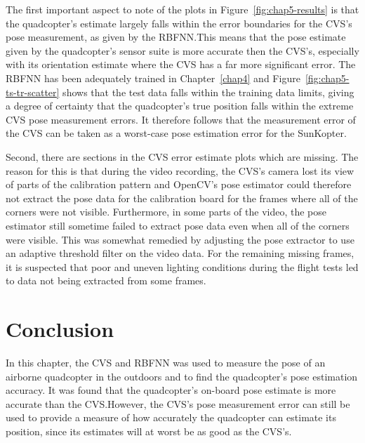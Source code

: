 The first important aspect to note of the plots in Figure~\ref{fig:chap5-results} is that the quadcopter's estimate largely falls within the error boundaries for the CVS's pose measurement, as given by the RBFNN.\@ This means that the pose estimate given by the quadcopter's sensor suite is more accurate then the CVS's, especially with its orientation estimate where the CVS has a far more significant error. The RBFNN has been adequately trained in Chapter~\ref{chap4} and Figure~\ref{fig:chap5-ts-tr-scatter} shows that the test data falls within the training data limits, giving a degree of certainty that the quadcopter's true position falls within the extreme CVS pose measurement errors. It therefore follows that the measurement error of the CVS can be taken as a worst-case pose estimation error for the SunKopter. 

Second, there are sections in the CVS error estimate plots which are missing. The reason for this is that during the video recording, the CVS's camera lost its view of parts of the calibration pattern and OpenCV's pose estimator could therefore not extract the pose data for the calibration board for the frames where all of the corners were not visible. Furthermore, in some parts of the video, the pose estimator still sometime failed to extract pose data even when all of the corners were visible. This was somewhat remedied by adjusting the pose extractor to use an adaptive threshold filter on the video data. For the remaining missing frames, it is suspected that poor and uneven lighting conditions during the flight tests led to data not being extracted from some frames. 

\section{Conclusion}

In this chapter, the CVS and RBFNN was used to measure the pose of an airborne quadcopter in the outdoors and to find the quadcopter's pose estimation accuracy. It was found that the quadcopter's on-board pose estimate is more accurate than the CVS.\@ However, the CVS's pose measurement error can still be used to provide a measure of how accurately the quadcopter can estimate its position, since its estimates will at worst be as good as the CVS's.\@ 
